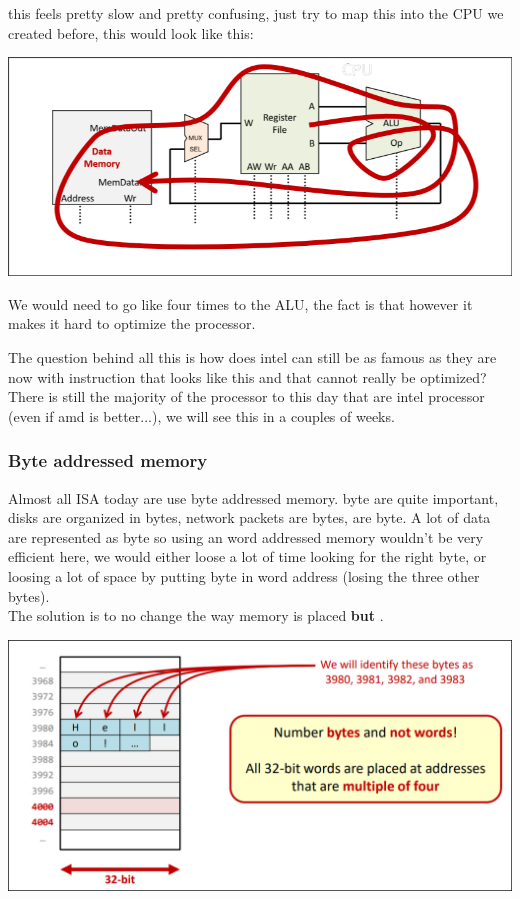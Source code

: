 \begin{framedremark}
\begin{itemize}
\end{itemize}
	 this feels pretty slow and pretty confusing, just try to map this into the CPU we created before, this would look like this:
		\begin{center}
		\includegraphics[scale=0.2]{screenshots/2025-10-12_9.png}
		\end{center}
We would need to go like four times to the ALU, the fact is that  however it makes it hard to optimize the processor.
\end{framedremark}
The question behind all this is how does intel can still be as famous as they are now with instruction that looks like this and that cannot really be optimized? There is still the majority of the processor to this day that are intel processor (even if amd is better...), we will see this in a couples of weeks.
\subsubsection{Byte addressed memory}

Almost all ISA today are use byte addressed memory. byte are quite important, disks are organized in bytes, network packets are bytes,  are byte. A lot of data are represented as byte so using an word addressed memory wouldn't be very efficient here, we would either loose a lot of time looking for the right byte, or loosing a lot of space by putting byte in word address (losing the three other bytes).\\
The solution is to no change the way memory is placed \textbf{but} .
\begin{center}
\includegraphics[scale=0.3]{screenshots/2025-10-12_10.png}
\end{center}
